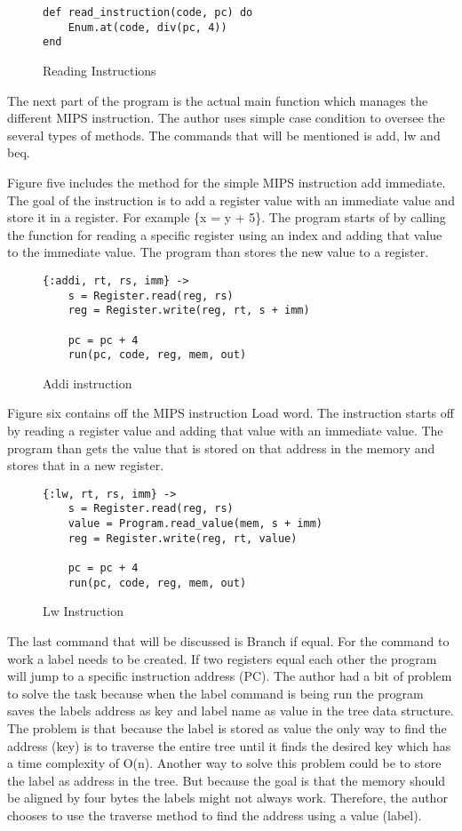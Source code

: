 \documentclass[a4paper,11pt]{article}
\begin{document}
\begin{figure}[H]
\begin{verbatim}
def read_instruction(code, pc) do
    Enum.at(code, div(pc, 4))
end
\end{verbatim}
\caption{Reading Instructions}
\label{Figure:4}
\end{figure}

The next part of the program is the actual main function which manages the different MIPS instruction. The author uses simple case condition to oversee the several types of methods. The commands that will be mentioned is add, lw and beq.

Figure five includes the method for the simple MIPS instruction add immediate. The goal of the instruction is to add a register value with an immediate value and store it in a register. For example \{x = y + 5\}. The program starts of by calling the function for reading a specific register using an index and adding that value to the immediate value. The program than stores the new value to a register.

\begin{figure}[H]
\begin{verbatim}
{:addi, rt, rs, imm} ->
    s = Register.read(reg, rs)
    reg = Register.write(reg, rt, s + imm)

    pc = pc + 4
    run(pc, code, reg, mem, out)
\end{verbatim}
\caption{Addi instruction}
\label{Figure:5}
\end{figure}

Figure six contains off the MIPS instruction Load word. The instruction starts off by reading a register value and adding that value with an immediate value. The program than gets the value that is stored on that address in the memory and stores that in a new register.

\begin{figure}[H]
\begin{verbatim}
{:lw, rt, rs, imm} ->
    s = Register.read(reg, rs)
    value = Program.read_value(mem, s + imm)
    reg = Register.write(reg, rt, value)

    pc = pc + 4
    run(pc, code, reg, mem, out)
\end{verbatim}
\caption{Lw Instruction}
\label{Figure:6}
\end{figure}


The last command that will be discussed is Branch if equal. For the command to work a label needs to be created. If two registers equal each other the program will jump to a specific instruction address (PC). The author had a bit of problem to solve the task because when the label command is being run the program saves the labels address as key and label name as value in the tree data structure. The problem is that because the label is stored as value the only way to find the address (key) is to traverse the entire tree until it finds the desired key which has a time complexity of O(n). Another way to solve this problem could be to store the label as address in the tree. But because the goal is that the memory should be aligned by four bytes the labels might not always work. Therefore, the author chooses to use the traverse method to find the address using a value (label).
\end{document}
